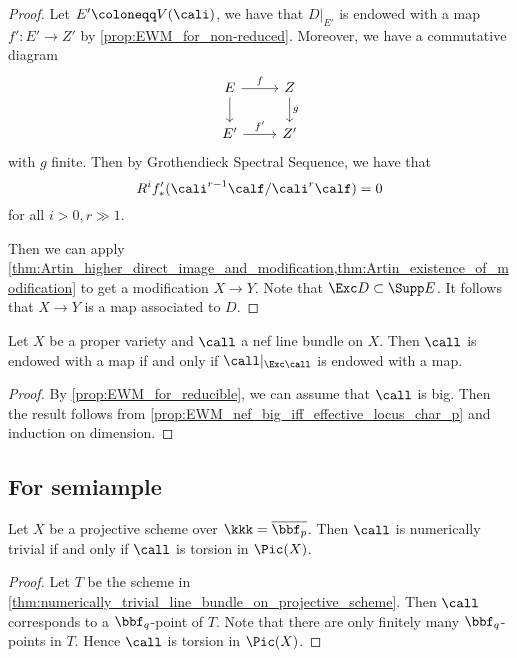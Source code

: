 \begin{proof}
        Let \(E' \coloneqq V(\cali)\), we have that \(D|_{E'}\) is endowed with a map \(f':E' \to Z'\) by \cref{prop:EWM_for_non-reduced}.
        Moreover, we have a commutative diagram
        \[ \begin{tikzcd}
            E \arrow[r, "f"] \arrow[d] & Z \arrow[d, "g"] \\
            E' \arrow[r, "f'"] & Z'
        \end{tikzcd} \]
        with \(g\) finite.
        Then by Grothendieck Spectral Sequence, we have that
        \[ R^if'_*(\cali^{r-1}\calf/\cali^{r}\calf) = 0 \]
        for all \(i > 0, r \gg 1\).
        
        Then we can apply \cref{thm:Artin_higher_direct_image_and_modification,thm:Artin_existence_of_modification} to get a modification \(X \to Y\).
        Note that \(\Exc D \subset \Supp E\).
        It follows that \(X \to Y\) is a map associated to \(D\).
    \end{proof}

    \begin{theorem}\label{thm:EWM_iff_EWM_on_exceptional_locus}
        Let \(X\) be a proper variety and \(\call\) a nef line bundle on \(X\).
        Then \(\call\) is endowed with a map if and only if \(\call|_{\Exc \call}\) is endowed with a map.
    \end{theorem}
    \begin{proof}
        By \cref{prop:EWM_for_reducible}, we can assume that \(\call\) is big.
        Then the result follows from \cref{prop:EWM_nef_big_iff_effective_locus_char_p} and induction on dimension.
    \end{proof}


\subsection{For semiample}

    \begin{lemma}\label{lem:pic0_over_overline_bbf_p_is_torsion}
        Let \(X\) be a projective scheme over \(\kkk = \overline{\bbf_p}\).
        Then \(\call\) is numerically trivial if and only if \(\call\) is torsion in \(\Pic(X)\).
    \end{lemma}
    \begin{proof}
        Let \(T\) be the scheme in \cref{thm:numerically_trivial_line_bundle_on_projective_scheme}.
        Then \(\call\) corresponds to a \(\bbf_q\)-point of \(T\).
        Note that there are only finitely many \(\bbf_q\)-points in \(T\).
        Hence \(\call\) is torsion in \(\Pic(X)\). 
    \end{proof}

